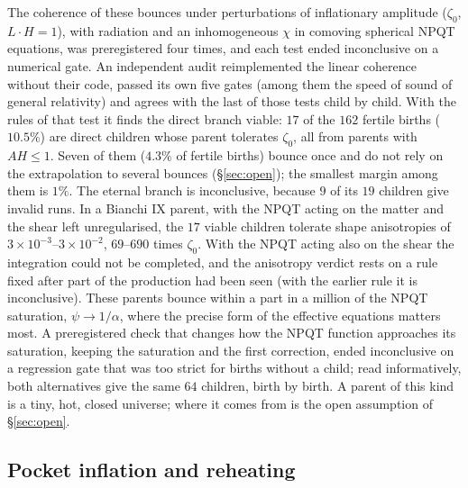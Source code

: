 \documentclass[11pt,a4paper]{article}
\begin{document}
The coherence of these bounces under perturbations of inflationary amplitude ($\zeta_0$, $L\cdot H=1$), with radiation and an inhomogeneous $\chi$ in comoving spherical NPQT equations, was preregistered four times, and each test ended inconclusive on a numerical gate.
An independent audit reimplemented the linear coherence without their code, passed its own five gates (among them the speed of sound of general relativity) and agrees with the last of those tests child by child.
With the rules of that test it finds the direct branch viable: $17$ of the $162$ fertile births ($10.5\%$) are direct children whose parent tolerates $\zeta_0$, all from parents with $AH\le1$. Seven of them ($4.3\%$ of fertile births) bounce once and do not rely on the extrapolation to several bounces (\S\ref{sec:open}); the smallest margin among them is $1\%$. The eternal branch is inconclusive, because $9$ of its $19$ children give invalid runs.
In a Bianchi IX parent, with the NPQT acting on the matter and the shear left unregularised, the $17$ viable children tolerate shape anisotropies of $3\times10^{-3}$--$3\times10^{-2}$, $69$--$690$ times $\zeta_0$. With the NPQT acting also on the shear the integration could not be completed, and the anisotropy verdict rests on a rule fixed after part of the production had been seen (with the earlier rule it is inconclusive).
These parents bounce within a part in a million of the NPQT saturation, $\psi\to1/\alpha$, where the precise form of the effective equations matters most. A preregistered check that changes how the NPQT function approaches its saturation, keeping the saturation and the first correction, ended inconclusive on a regression gate that was too strict for births without a child; read informatively, both alternatives give the same $64$ children, birth by birth.
A parent of this kind is a tiny, hot, closed universe; where it comes from is the open assumption of \S\ref{sec:open}.

\subsection{Pocket inflation and reheating}
\label{sec:pocket}
\end{document}
